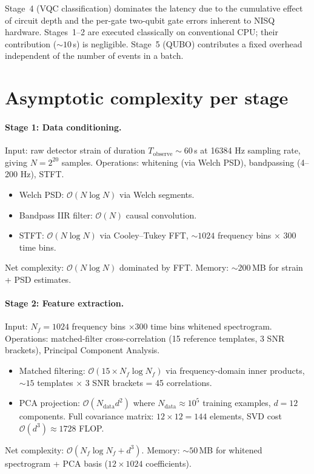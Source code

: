 \documentclass[11pt,a4paper, english]{book}
\theoremstyle{plain}
\theoremstyle{definition}
\numberwithin{equation}{chapter}
\numberwithin{figure}{chapter}
\numberwithin{table}{chapter}
\begin{document}
Stage~4 (VQC classification) dominates the latency due to the cumulative effect 
of circuit depth and the per-gate two-qubit gate errors inherent to NISQ hardware. 
Stages~1--2 are executed classically on conventional CPU; their contribution 
($\sim 10$\,s) is negligible. Stage~5 (QUBO) contributes a fixed overhead 
independent of the number of events in a batch.

\section{Asymptotic complexity per stage}

\paragraph{Stage 1: Data conditioning.}
Input: raw detector strain of duration $T_\mathrm{observe} \sim 60$\,s at 
16384 Hz sampling rate, giving $N = 2^{20}$ samples. Operations: whitening 
(via Welch PSD), bandpassing (4--200 Hz), STFT.
\begin{itemize}
  \item Welch PSD: $\mathcal{O}(N \log N)$ via Welch segments.
  \item Bandpass IIR filter: $\mathcal{O}(N)$ causal convolution.
  \item STFT: $\mathcal{O}(N \log N)$ via Cooley--Tukey FFT, $\sim 1024$ 
        frequency bins $\times$ 300 time bins.
\end{itemize}
Net complexity: $\mathcal{O}(N \log N)$ dominated by FFT. Memory: $\sim 200$\,MB 
for strain + PSD estimates.

\paragraph{Stage 2: Feature extraction.}
Input: $N_f = 1024$ frequency bins $\times 300$ time bins whitened spectrogram. 
Operations: matched-filter cross-correlation (15 reference templates, 3 SNR brackets), 
Principal Component Analysis.
\begin{itemize}
  \item Matched filtering: $\mathcal{O}(15 \times N_f \log N_f)$ via 
        frequency-domain inner products, $\sim 15$ templates $\times$ 3 SNR brackets 
        = 45 correlations.
  \item PCA projection: $\mathcal{O}(N_{\mathrm{data}} d^2)$ where 
        $N_{\mathrm{data}} \approx 10^5$ training examples, $d = 12$ components. 
        Full covariance matrix: $12 \times 12 = 144$ elements, SVD cost 
        $\mathcal{O}(d^3) \approx 1728$ FLOP.
\end{itemize}
Net complexity: $\mathcal{O}(N_f \log N_f + d^3)$. Memory: $\sim 50$\,MB for 
whitened spectrogram + PCA basis ($12 \times 1024$ coefficients).
\end{document}
